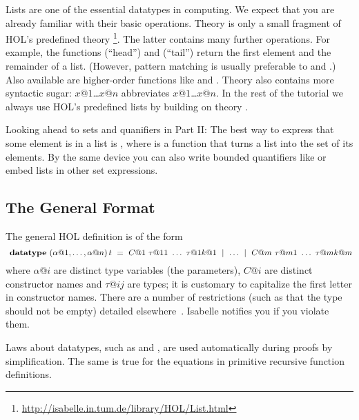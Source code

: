 %
Lists are one of the essential datatypes in computing.  We expect that you
are already familiar with their basic operations.
Theory  is only a small fragment of HOL's predefined theory
\footnote{\url{http://isabelle.in.tum.de/library/HOL/List.html}}.
The latter contains many further operations. For example, the functions
 (``head'') and  (``tail'') return the first
element and the remainder of a list. (However, pattern matching is usually
preferable to  and .)  
Also available are higher-order functions like  and .
Theory  also contains
more syntactic sugar: \isa{[}$x@1$\isa{,}\dots\isa{,}$x@n$\isa{]} abbreviates
$x@1$\isa{\#}\dots\isa{\#}$x@n$\isa{\#[]}.  In the rest of the tutorial we
always use HOL's predefined lists by building on theory .
\begin{warn}
Looking ahead to sets and quanifiers in Part II:
The best way to express that some element  is in a list  is
, where  is a function that turns a list into the
set of its elements.
By the same device you can also write bounded quantifiers like
 or embed lists in other set expressions.
\end{warn}


\subsection{The General Format}
\label{sec:general-datatype}

The general HOL  definition is of the form
\[
\isacommand{datatype}~(\alpha@1, \dots, \alpha@n) \, t ~=~
C@1~\tau@{11}~\dots~\tau@{1k@1} ~\mid~ \dots ~\mid~
C@m~\tau@{m1}~\dots~\tau@{mk@m}
\]
where $\alpha@i$ are distinct type variables (the parameters), $C@i$ are distinct
constructor names and $\tau@{ij}$ are types; it is customary to capitalize
the first letter in constructor names. There are a number of
restrictions (such as that the type should not be empty) detailed
elsewhere~\cite{isabelle-HOL}. Isabelle notifies you if you violate them.

Laws about datatypes, such as  and
, are used automatically
during proofs by simplification.  The same is true for the equations in
primitive recursive function definitions.


